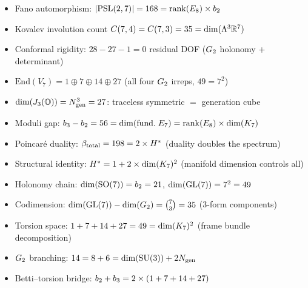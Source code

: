\begin{itemize}
    \item Fano automorphism: $|\mathrm{PSL}(2,7)| = 168 = \mathrm{rank}(E_8) \times b_2$
    \item Kovalev involution count $C(7,4) = C(7,3) = 35 = \mathrm{dim}(\Lambda^3 \mathbb{R}^7)$
    \item Conformal rigidity: $28 - 27 - 1 = 0$ residual DOF ($G_2$ holonomy + determinant)
    \item $\mathrm{End}(V_7) = 1 \oplus 7 \oplus 14 \oplus 27$ (all four $G_2$ irreps, $49 = 7^2$)
    \item $\mathrm{dim}(J_3(\mathbb{O})) = N_{\mathrm{gen}}^3 = 27$: traceless symmetric $=$ generation cube
    \item Moduli gap: $b_3 - b_2 = 56 = \mathrm{dim}(\mathrm{fund.}\; E_7) = \mathrm{rank}(E_8) \times \mathrm{dim}(K_7)$
    \item Poincar\'e duality: $\beta_{\mathrm{total}} = 198 = 2 \times H^*$ (duality doubles the spectrum)
    \item Structural identity: $H^* = 1 + 2 \times \mathrm{dim}(K_7)^2$ (manifold dimension controls all)
    \item Holonomy chain: $\mathrm{dim}(\mathrm{SO}(7)) = b_2 = 21$, $\mathrm{dim}(\mathrm{GL}(7)) = 7^2 = 49$
    \item Codimension: $\mathrm{dim}(\mathrm{GL}(7)) - \mathrm{dim}(G_2) = \binom{7}{3} = 35$ (3-form components)
    \item Torsion space: $1 + 7 + 14 + 27 = 49 = \mathrm{dim}(K_7)^2$ (frame bundle decomposition)
    \item $G_2$ branching: $14 = 8 + 6 = \mathrm{dim}(\mathrm{SU}(3)) + 2 N_{\mathrm{gen}}$
    \item Betti--torsion bridge: $b_2 + b_3 = 2 \times (1 + 7 + 14 + 27)$
\end{itemize}
